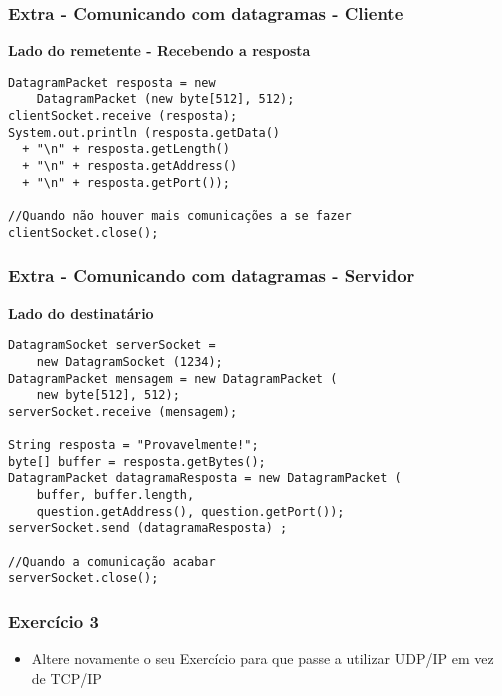 \documentclass[Ligatures=TeX,table,brazil,svgnames,usetotalslideindicator,comp
ress,10pt]{beamer}
\begin{document}
\begin{frame}[fragile]
  \frametitle{Extra - Comunicando com datagramas - Cliente}

  \textbf{\alert{Lado do remetente - Recebendo a resposta}}

\begin{verbatim}
DatagramPacket resposta = new
    DatagramPacket (new byte[512], 512);
clientSocket.receive (resposta);
System.out.println (resposta.getData()
  + "\n" + resposta.getLength()
  + "\n" + resposta.getAddress()
  + "\n" + resposta.getPort());

//Quando não houver mais comunicações a se fazer
clientSocket.close();
\end{verbatim}

\end{frame}

\begin{frame}[fragile]
  \frametitle{Extra - Comunicando com datagramas - Servidor}

  \textbf{\alert{Lado do destinatário}}

\begin{verbatim}
DatagramSocket serverSocket =
    new DatagramSocket (1234);
DatagramPacket mensagem = new DatagramPacket (
    new byte[512], 512);
serverSocket.receive (mensagem);

String resposta = "Provavelmente!";
byte[] buffer = resposta.getBytes();
DatagramPacket datagramaResposta = new DatagramPacket (
    buffer, buffer.length,
    question.getAddress(), question.getPort());
serverSocket.send (datagramaResposta) ;

//Quando a comunicação acabar
serverSocket.close();
\end{verbatim}
\end{frame}

\begin{frame}
  \frametitle{Exercício 3}
  \begin{itemize}
    \item Altere novamente o seu Exercício para que passe a utilizar UDP/IP em vez de TCP/IP
  \end{itemize}
\end{frame}
\end{document}
